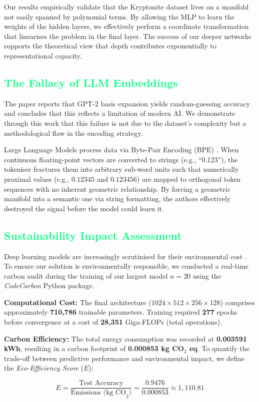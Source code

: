 \documentclass{article}
\newcommand{\csubsection}[1]{\subsection{\textcolor{springgreen}{#1}}}
\begin{document}
Our results empirically validate that the Kryptonite dataset lives on a manifold not easily spanned by polynomial terms. By allowing the MLP to learn the weights of the hidden layers, we effectively perform a coordinate transformation that linearises the problem in the final layer. The success of our deeper networks supports the theoretical view that depth contributes exponentially to representational capacity.

\csubsection{The Fallacy of LLM Embeddings}
The paper \citep{harley2025} reports that GPT-2 basis expansion yields random-guessing accuracy and concludes that this reflects a limitation of modern AI. We demonstrate through this work that this failure is not due to the dataset’s complexity but a methodological flaw in the encoding strategy.

Large Language Models process data via Byte-Pair Encoding (BPE) \citep{sennrich2015}. When continuous floating-point vectors are converted to strings (e.g., “0.123”), the tokeniser fractures them into arbitrary sub-word units such that numerically proximal values (e.g., $0.12345$ and $0.123456$) are mapped to orthogonal token sequences with no inherent geometric relationship. By forcing a geometric manifold into a semantic one via string formatting, the authors effectively destroyed the signal before the model could learn it.


\csubsection{Sustainability Impact Assessment}

Deep learning models are increasingly scrutinised for their environmental cost \citep{lacoste2019}. To ensure our solution is environmentally responsible, we conducted a real-time carbon audit during the training of our largest model $n=20$ using the \textit{CodeCarbon} Python package.

\textbf{Computational Cost:} The final architecture ($1024 \times 512 \times 256 \times 128$) comprises approximately \textbf{710,786} trainable parameters. Training required \textbf{277} epochs before convergence at a cost of \textbf{28,351} Giga-FLOPs (total operations).

\textbf{Carbon Efficiency:} The total energy consumption was recorded at \textbf{0.003591 kWh}, resulting in a carbon footprint of \textbf{0.000853 kg CO$_2$ eq}. To quantify the trade-off between predictive performance and environmental impact, we define the \textit{Eco-Efficiency Score} ($E$):

\begin{equation}
    E = \frac{\text{Test Accuracy}}{\text{Emissions (kg CO}_2\text{)}} = \frac{0.9476}{0.000853} \approx 1,110.81
\end{equation}
\end{document}
